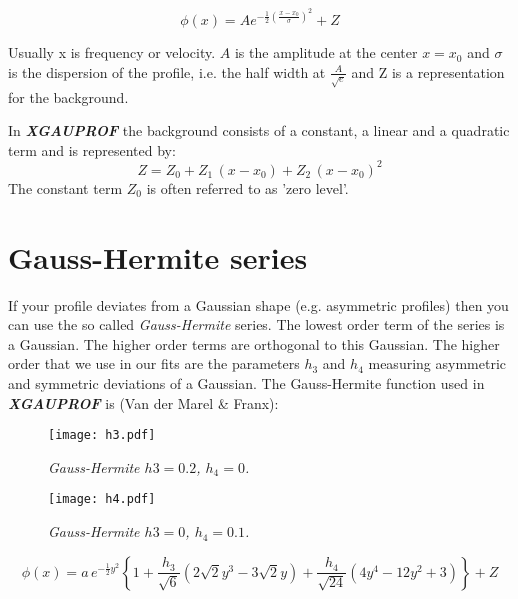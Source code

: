 \documentclass[10pt,a4paper]{report}
\def\epow{A{e^{-\frac{1}{2} {\left(\frac{x - x_0}{\sigma}\right)}^2}}}
\begin{document}
\begin{flushleft}
\begin{equation}
\phi(x) = \epow + Z
\end{equation}

Usually x is frequency or velocity. $A$ is the amplitude at the center 
$x = x_0$ 
and ${\sigma }$ is the dispersion of the profile, i.e. the half width at 
$\frac{A}{\sqrt{e}}$ and Z is a representation for the background.


In {\bf \it XGAUPROF} the background consists of a constant, a linear and 
a quadratic term and
is represented by:
\begin{equation}
Z = Z_0 + Z_1\, (x-x_0) + Z_2\, (x-x_0)^2
\end{equation}
The constant term $Z_0$ is often referred to as 'zero level'. 


\section{Gauss-Hermite series}

If your profile deviates from a Gaussian shape (e.g. asymmetric profiles) 
then you can use the so called {\it Gauss-Hermite} series.
The lowest order term of the series is a
Gaussian. The higher order terms are orthogonal to this Gaussian.
The higher order that we use in our fits are the 
parameters $h_3$ and $h_4$ measuring asymmetric and symmetric 
deviations of a Gaussian. 
The Gauss-Hermite function used in {\bf \it XGAUPROF} is (Van der Marel \& Franx):



\begin{center} 
\begin{figure}[htb]
\begin{minipage}{7cm} 
  \centering
  \texttt{[image: h3.pdf]}
  \caption{\it Gauss-Hermite $h3 = 0.2$, $h_4 = 0$. } 
  \label{fig:skewness}
\end{minipage}
\begin{minipage}{7cm}
  \centering
  \texttt{[image: h4.pdf]}
  \caption{\it Gauss-Hermite $h3 = 0$, $h_4 =0.1$. }
  \label{fig:kurtosis}
\end{minipage} 
\end{figure} 
\end{center}


\begin{equation}
\phi(x) = a\,e^{-\frac{1}{2}y^2} \left\{ 1+\frac{h_3}{\sqrt{6}}
(2\sqrt{2}y^3-3\sqrt{2}y) + 
\frac{h_4}{\sqrt{24}}(4y^4-12y^2+3)   \right\} + Z
\end{equation} 



\end{flushleft}
\end{document}
